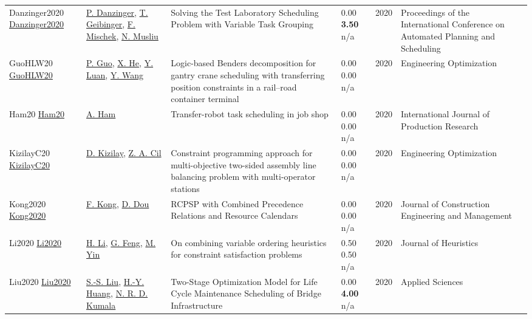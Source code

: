 {\begin{longtable}{p{3cm}p{5cm}p{10cm}p{1cm}rp{2.5cm}l}
Danzinger2020 \href{http://dx.doi.org/10.1609/icaps.v30i1.6681}{Danzinger2020} & \hyperref[auth:a1484]{P. Danzinger}, \hyperref[auth:a77]{T. Geibinger}, \hyperref[auth:a80]{F. Mischek}, \hyperref[auth:a45]{N. Musliu} & Solving the Test Laboratory Scheduling Problem with Variable Task Grouping & \noindent{}\textcolor{black!50}{0.00} \textbf{3.50} n/a & 2020 & Proceedings of the International Conference on Automated Planning and Scheduling & \cite{Danzinger2020}\\
GuoHLW20 \href{http://dx.doi.org/10.1080/0305215x.2019.1699919}{GuoHLW20} & \hyperref[auth:a931]{P. Guo}, \hyperref[auth:a932]{X. He}, \hyperref[auth:a933]{Y. Luan}, \hyperref[auth:a934]{Y. Wang} & Logic-based Benders decomposition for gantry crane scheduling with transferring position constraints in a rail–road container terminal & \noindent{}\textcolor{black!50}{0.00} \textcolor{black!50}{0.00} n/a & 2020 & \cellcolor{red!20}Engineering Optimization & \cite{GuoHLW20}\\
Ham20 \href{http://dx.doi.org/10.1080/00207543.2019.1709671}{Ham20} & \hyperref[auth:a750]{A. Ham} & Transfer-robot task scheduling in job shop & \noindent{}\textcolor{black!50}{0.00} \textcolor{black!50}{0.00} n/a & 2020 & \cellcolor{red!20}International Journal of Production Research & \cite{Ham20}\\
KizilayC20 \href{http://dx.doi.org/10.1080/0305215x.2020.1786081}{KizilayC20} & \hyperref[auth:a1380]{D. Kizilay}, \hyperref[auth:a1381]{Z. A. Cil} & Constraint programming approach for multi-objective two-sided assembly line balancing problem with multi-operator stations & \noindent{}\textcolor{black!50}{0.00} \textcolor{black!50}{0.00} n/a & 2020 & \cellcolor{red!20}Engineering Optimization & \cite{KizilayC20}\\
Kong2020 \href{http://dx.doi.org/10.1061/(asce)co.1943-7862.0001929}{Kong2020} & \hyperref[auth:a1706]{F. Kong}, \hyperref[auth:a1780]{D. Dou} & RCPSP with Combined Precedence Relations and Resource Calendars & \noindent{}\textcolor{black!50}{0.00} \textcolor{black!50}{0.00} n/a & 2020 & Journal of Construction Engineering and Management & \cite{Kong2020}\\
Li2020 \href{http://dx.doi.org/10.1007/s10732-019-09434-9}{Li2020} & \hyperref[auth:a1796]{H. Li}, \hyperref[auth:a1811]{G. Feng}, \hyperref[auth:a1812]{M. Yin} & On combining variable ordering heuristics for constraint satisfaction problems & \noindent{}0.50 0.50 n/a & 2020 & Journal of Heuristics & \cite{Li2020}\\
Liu2020 \href{http://dx.doi.org/10.3390/app10248887}{Liu2020} & \hyperref[auth:a1244]{S.-S. Liu}, \hyperref[auth:a1494]{H.-Y. Huang}, \hyperref[auth:a1495]{N. R. D. Kumala} & \cellcolor{gold!20}Two-Stage Optimization Model for Life Cycle Maintenance Scheduling of Bridge Infrastructure & \noindent{}\textcolor{black!50}{0.00} \textbf{4.00} n/a & 2020 & Applied Sciences & \cite{Liu2020}\\

\end{longtable}}
